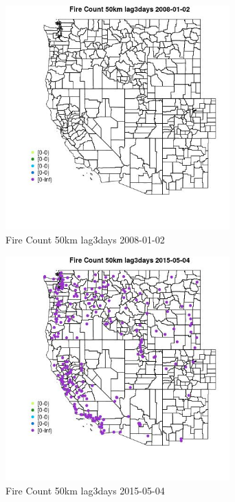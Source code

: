 \begin{figure} 
\centering  
\includegraphics[width=0.77\textwidth]{Code_Outputs/Report_ML_input_PM25_Step4_part_e_de_duplicated_aves_compiled_2019-05-18wNAs_MapObsFire_Count_50km_lag3days2008-01-02.jpg} 
\caption{\label{fig:Report_ML_input_PM25_Step4_part_e_de_duplicated_aves_compiled_2019-05-18wNAsMapObsFire_Count_50km_lag3days2008-01-02}Fire Count 50km lag3days 2008-01-02} 
\end{figure} 
 

\begin{figure} 
\centering  
\includegraphics[width=0.77\textwidth]{Code_Outputs/Report_ML_input_PM25_Step4_part_e_de_duplicated_aves_compiled_2019-05-18wNAs_MapObsFire_Count_50km_lag3days2015-05-04.jpg} 
\caption{\label{fig:Report_ML_input_PM25_Step4_part_e_de_duplicated_aves_compiled_2019-05-18wNAsMapObsFire_Count_50km_lag3days2015-05-04}Fire Count 50km lag3days 2015-05-04} 
\end{figure} 
 

